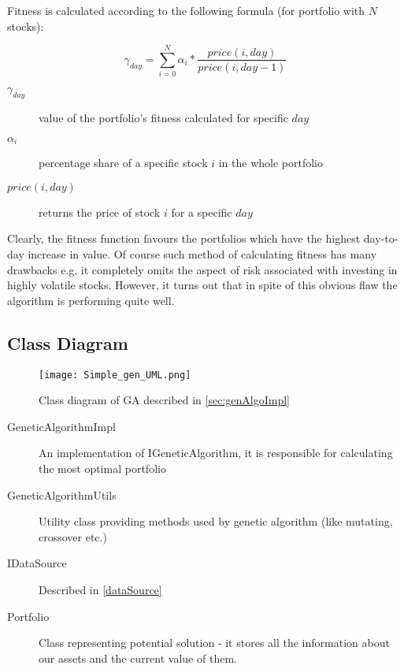 Fitness is calculated according to the following formula (for portfolio with $N$ stocks):

\begin{equation}
    \gamma_{day} =  \sum_{i=0}^{N} {  \alpha_{i} * \frac{price(i,day)}{price(i,day - 1)} }
\end{equation}

\begin{description}
  \item [$\gamma_{day}$] 
      value of the portfolio's fitness calculated for specific $day$
  \item [$\alpha_{i}$]
      percentage share of a specific stock $i$ in the whole portfolio
  \item [$price(i,day)$]
      returns the price of stock $i$ for a specific $day$
\end{description}

Clearly, the fitness function favours the portfolios which have the highest day-to-day increase in value.
Of course such method of calculating fitness has many drawbacks e.g. it completely omits the aspect of risk associated with investing in highly volatile stocks.
However, it turns out that in spite of this obvious flaw the algorithm is performing quite well.  

\subsection{Class Diagram}

\begin{figure}[H]   
	    \begin{center}
	      \texttt{[image: Simple\_gen\_UML.png]}
	    \end{center}
	    \caption{Class diagram of GA described in \ref{sec:genAlgoImpl}} 
	  \end{figure}

\begin{description}
  \item [GeneticAlgorithmImpl]
    An implementation of IGeneticAlgorithm, it is responsible for calculating the most optimal portfolio
  \item [GeneticAlgorithmUtils]
    Utility class providing methods used by genetic algorithm (like mutating, crossover etc.)
  \item [IDataSource]
    Described in \ref{dataSource}
  \item [Portfolio]
    Class representing potential solution - it stores all the information about our assets and the current value of them.

\end{description}

